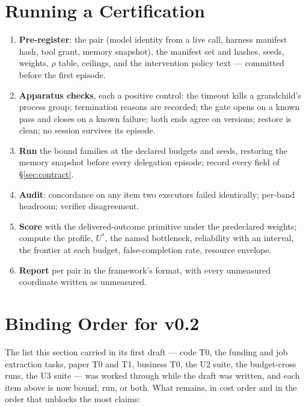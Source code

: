 \documentclass[11pt]{article}
\theoremstyle{definition}
\begin{document}
\section{Running a Certification}\label{sec:run}

\begin{enumerate}[leftmargin=*]
\item \textbf{Pre-register}: the pair (model identity from a live call, harness manifest hash, tool grant, memory snapshot), the manifest set and hashes, seeds, weights, $\rho$ table, ceilings, and the intervention policy text --- committed before the first episode.
\item \textbf{Apparatus checks}, each a positive control: the timeout kills a grandchild's process group; termination reasons are recorded; the gate opens on a known pass and closes on a known failure; both ends agree on versions; restore is clean; no session survives its episode.
\item \textbf{Run} the bound families at the declared budgets and seeds, restoring the memory snapshot before every delegation episode; record every field of \S\ref{sec:contract}.
\item \textbf{Audit}: concordance on any item two executors failed identically; per-band headroom; verifier disagreement.
\item \textbf{Score} with the delivered-outcome primitive under the predeclared weights; compute the profile, $U^{*}$, the named bottleneck, reliability with an interval, the frontier at each budget, false-completion rate, resource envelope.
\item \textbf{Report} per pair in the framework's format, with every unmeasured coordinate written as unmeasured.
\end{enumerate}

\section{Binding Order for v0.2}\label{sec:roadmap}

The list this section carried in its first draft --- code T0, the funding and job extraction tasks, paper T0 and T1, business T0, the U2 suite, the budget-cross runs, the U3 suite --- was worked through while the draft was written, and each item above is now bound, run, or both. What remains, in cost order and in the order that unblocks the most claims:
\end{document}
